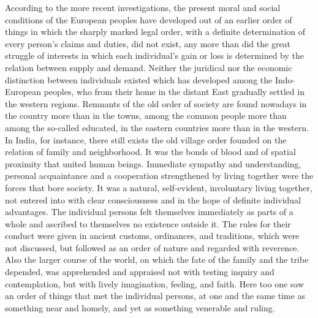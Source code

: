\documentclass[12pt,a4paper,openany]{book}
\newcommand{\opage}[1]{\marginnote{\footnotesize\textit{[#1]}}}
\begin{document}
According to the more recent investigations, the present moral and social
conditions of the European peoples have developed out of
\opage{145}an earlier order of things in which the sharply marked
legal order, with a definite determination of every person's claims
and duties, did not exist, any more than did the great
struggle of interests in which each individual's gain
or loss is determined by the relation between supply and
demand. Neither the juridical nor the
economic distinction between individuals existed which has developed
among the Indo-European peoples, who from their home in
the distant East gradually settled in the western regions.
Remnants of the old order of society are found nowadays
in the country more than in the towns, among the common people more than among
the so-called educated, in the eastern countries more than in the
western. In India, for instance, there still exists the old village order
founded on the relation of family and neighborhood. It was
the bonds of blood and of spatial proximity that united
human beings. Immediate sympathy and understanding, personal
acquaintance and a cooperation strengthened by living together were the
forces that bore society. It was a natural,
self-evident, involuntary living together, not entered into with clear consciousness
and in the hope of definite individual advantages. The individual
persons felt themselves immediately as parts of a whole and
ascribed to themselves no existence outside it. The rules for their
conduct were given in ancient customs, ordinances, and
traditions, which were not discussed, but followed as an
order of nature and regarded with reverence. Also the larger
course of the world, on which the fate of the family and the tribe depended,
was apprehended and appraised not with testing inquiry and
contemplation, but with lively imagination, feeling, and faith.
Here too one saw an order of things that met the
individual persons, at one and the same time as something near and
homely, and yet as something venerable and ruling.
\end{document}

